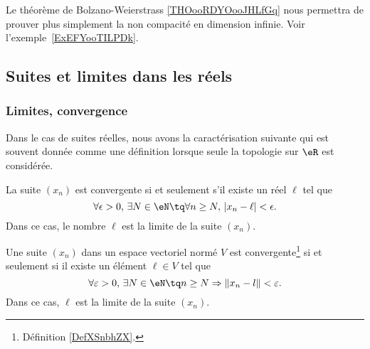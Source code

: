 Le théorème de Bolzano-Weierstrass \ref{THOooRDYOooJHLfGq} nous permettra de prouver plus simplement la non compacité en dimension infinie. Voir l'exemple~\ref{ExEFYooTILPDk}.


\subsection{Suites et limites dans les réels}

\subsubsection{Limites, convergence}

Dans le cas de suites réelles, nous avons la caractérisation suivante qui est souvent donnée comme une définition lorsque seule la topologie sur \( \eR\) est considérée.
\begin{proposition}	\label{PropLimiteSuiteNum}
	La suite $(x_n)$ est convergente si et seulement s'il existe un réel $\ell$ tel que
	\begin{equation}		\label{EqDefLimSuite}
		\forall \epsilon>0,\,\exists N\in\eN\tq\forall n\geq N,\,| x_n-\ell |<\epsilon.
	\end{equation}
	Dans ce cas, le nombre $\ell$ est la limite de la suite $(x_n)$.
\end{proposition}

\begin{propositionDef}		\label{PROPooOSXCooJWXkWH}
    Une suite $(x_n)$ dans un espace vectoriel normé $V$ est convergente\footnote{Définition \ref{DefXSnbhZX}.} si et seulement si il existe un élément $\ell\in V$ tel que
	\begin{equation}
		\forall \varepsilon>0,\,\exists N\in\eN\tq n\geq N\Rightarrow \| x_n-l \|<\varepsilon.
	\end{equation}
	Dans ce cas, $\ell$ est la limite de la suite $(x_n)$.
\end{propositionDef}

